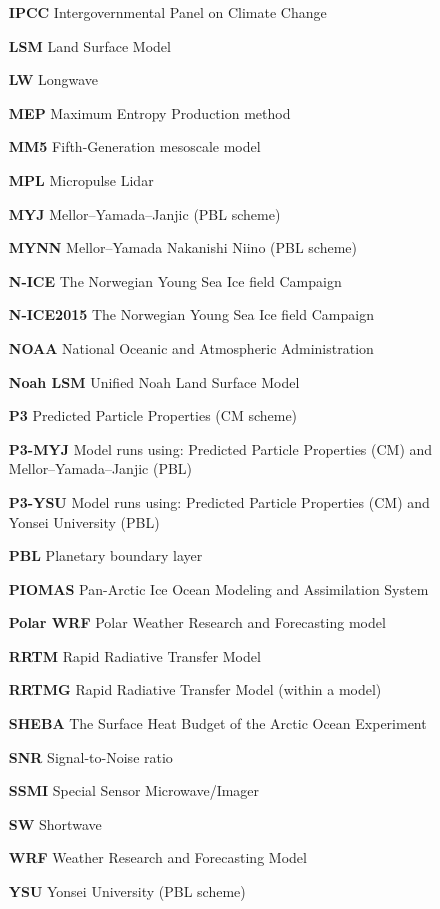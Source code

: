 \begin{enumerate}
    \item[\textbf{IPCC}] Intergovernmental Panel on Climate Change
    \item[\textbf{LSM}] Land Surface Model
    \item[\textbf{LW}] Longwave
    \item[\textbf{MEP}] Maximum Entropy Production method
    \item[\textbf{MM5}] Fifth-Generation mesoscale model
    \item[\textbf{MPL}] Micropulse Lidar
    \item[\textbf{MYJ}] Mellor–Yamada–Janjic (PBL scheme)
    \item[\textbf{MYNN}] Mellor–Yamada Nakanishi Niino (PBL scheme)
    \item[\textbf{N-ICE}] The Norwegian Young Sea Ice field Campaign
    \item[\textbf{N-ICE2015}] The Norwegian Young Sea Ice field Campaign
    \item[\textbf{NOAA}] National Oceanic and Atmospheric Administration
    \item[\textbf{Noah LSM}] Unified Noah Land Surface Model
    \item[\textbf{P3}] Predicted Particle Properties (CM scheme)
    \item[\textbf{P3-MYJ}] Model runs using: Predicted Particle Properties (CM) and \\
    \hspace*{3.3cm} Mellor–Yamada–Janjic (PBL)
    \item[\textbf{P3-YSU}] Model runs using: Predicted Particle Properties (CM) and \\
    \hspace*{3.3cm} Yonsei University (PBL)
    \item[\textbf{PBL}] Planetary boundary layer
    \item[\textbf{PIOMAS}] Pan-Arctic Ice Ocean Modeling and Assimilation System
    \item[\textbf{Polar WRF}] Polar Weather Research and Forecasting model
    \item[\textbf{RRTM}] Rapid Radiative Transfer Model
    \item[\textbf{RRTMG}] Rapid Radiative Transfer Model (within a model)
    \item[\textbf{SHEBA}] The Surface Heat Budget of the Arctic Ocean Experiment
    \item[\textbf{SNR}] Signal-to-Noise ratio
    \item[\textbf{SSMI}] Special Sensor Microwave/Imager
    \item[\textbf{SW}] Shortwave
    \item[\textbf{WRF}] Weather Research and Forecasting Model
    \item[\textbf{YSU}] Yonsei University (PBL scheme)
\end{enumerate}
